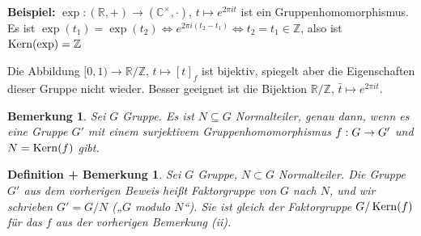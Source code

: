 \documentclass[a4paper,10pt,german]{scrbook}
\theoremstyle{saetze}
\theoremstyle{definitionen}
\newtheorem{DefBem}[Def]{Definition + Bemerkung}
\newtheorem{Bem}[Def]{Bemerkung}
\begin{document}
\textbf{Beispiel:} $\exp:(\mathbb R, +) \to (\mathbb C^\times, \cdot)$, $t\mapsto e^{2\pi i t}$ ist ein Gruppenhomomorphismus. Es ist $\exp(t_1) = \exp(t_2) \iff e^{2\pi i(t_2-t_1)} \iff t_2=t_1 \in \mathbb Z$, also ist $\mathop{\rm Kern}\nolimits(\exp) = \mathbb Z$

Die Abbildung $[0,1)\to\mathbb R/\mathbb Z$, $t \mapsto [t]_f$ ist bijektiv, spiegelt aber die Eigenschaften dieser Gruppe nicht wieder. Besser geeignet ist die Bijektion $\mathbb R/\mathbb Z$, $\bar t \mapsto e^{2\pi i t}$.

\begin{Bem}
    Sei $G$ Gruppe. Es ist $N \subseteq G$ Normalteiler, genau dann, wenn es eine Gruppe $G'$ mit einem surjektivem Gruppenhomomorphismus $f:G \rightarrow G'$ und $N
    =\mathop{\rm Kern}\nolimits(f)$ gibt. 
    
\end{Bem}
    
\begin{DefBem}
    Sei $G$ Gruppe, $N\subset G$ Normalteiler. Die Gruppe $G'$ aus dem vorherigen Beweis heißt Faktorgruppe von $G$ nach $N$, und wir schrieben $G' = G/N$ („$G$ modulo $N$“). Sie ist gleich der Faktorgruppe $G/\mathop{\rm Kern}\nolimits(f)$ für das $f$ aus der  vorherigen Bemerkung (ii).
\end{DefBem}
\end{document}
